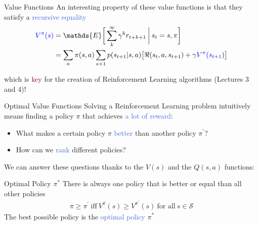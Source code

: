\documentclass{beamer}
\begin{document}
\begin{frame}{Value Functions}
	An interesting property of these value functions is that they satisfy a \textcolor{RoyalBlue}{recursive equality}
		\begin{align*}
		\textcolor{blue}{V^{\pi}(s)} & = \mathds{E} \bigg[\sum_{k}^{\infty}\gamma^{k} r_{t+k+1} \: \bigg| \: s_t=s,\pi \bigg] \\
			   & = \sum_a \pi(s,a) \sum_{s+1} p(s_{t+1}|s,a)\big[\Re(s_t, a, s_{t+1}) + \gamma \textcolor{blue}{V^{\pi}(s_{t+1}}) \big] 
		\end{align*}

	which is \textcolor{Maroon}{key} for the creation of Reinforcement Learning algorithms (Lectures 3 and 4)!
\end{frame}


\begin{frame}{Optimal Value Functions}
	Solving a Reinforcement Learning problem intuitively means finding a policy $\pi$ that achieves \textcolor{RoyalBlue}{a lot of reward}:
	\begin{itemize}
		\item What makes a certain policy $\pi$ \textcolor{RoyalBlue}{better} than another policy $\pi^{'}$? 
		\item How can we \textcolor{RoyalBlue}{rank} different policies?
	\end{itemize}
	
	We can answer these questions thanks to the $V(s)$ and the $Q(s,a)$ functions:

	\begin{block}{Optimal Policy $\pi^*$}
		There is always one policy that is better or equal than all other policies
	\begin{align*}
		\pi \geq \pi^{'}\: \text{iff}\: V^{\pi}(s) \geq V^{\pi^{'}}(s) \: \text{for all}\: s\in\mathcal{S}
	\end{align*}
		The best possible policy is the \textcolor{RoyalBlue}{optimal policy} $\pi^{*}$
	\end{block}
\end{frame}
\end{document}
